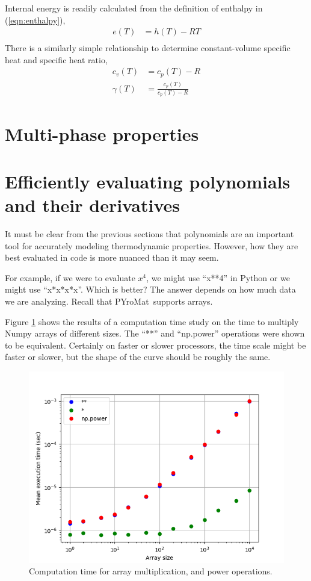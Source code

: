 \documentclass[letterpaper,11pt]{article}
\newcommand{\PM}{PYroMat}
\begin{document}
Internal energy is readily calculated from the definition of enthalpy in (\ref{eqn:enthalpy}),
\begin{align}
e(T) &= h(T) - RT\nonumber\\
\end{align}
There is a similarly simple relationship to determine constant-volume specific heat and specific heat ratio,
\begin{align}
c_v(T) &= c_p(T) - R\\
\gamma(T) &= \frac{c_p(T)}{c_p(T)-R}
\end{align}

\section{Multi-phase properties}

\section{Efficiently evaluating polynomials and their derivatives}

It must be clear from the previous sections that polynomials are an important tool for accurately modeling thermodynamic properties.  However, how they are best evaluated in code is more nuanced than it may seem.  

For example, if we were to evaluate $x^4$, we might use ``x**4'' in Python or we might use ``x*x*x*x''.  Which is better?  The answer depends on how much data we are analyzing.  Recall that \PM\ supports arrays.

Figure \ref{fig:benchmark} shows the results of a computation time study on the time to multiply Numpy arrays of different sizes.  The ``**'' and ``np.power'' operations were shown to be equivalent.  Certainly on faster or slower processors, the time scale might be faster or slower, but the shape of the curve should be roughly the same.

\begin{figure}
\centering
\includegraphics[width=.97\linewidth]{benchmark}
\caption{Computation time for array multiplication, and power operations.}\label{fig:benchmark}
\end{figure}
\end{document}
